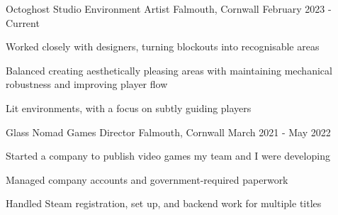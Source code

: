 

\begin{cventries}
    \cventry
        {Octoghost Studio}
        {Environment Artist}
        {Falmouth, Cornwall}
        {February 2023 - Current}
        {
            \begin{cvitems}
                \item Worked closely with designers, turning blockouts into recognisable areas
                \item Balanced creating aesthetically pleasing areas with maintaining mechanical robustness and improving player flow
                \item Lit environments, with a focus on subtly guiding players
            \end{cvitems}
        }

    \cventry
        {Glass Nomad Games}
        {Director}
        {Falmouth, Cornwall}
        {March 2021 - May 2022}
        {
            \begin{cvitems}
                \item Started a company to publish video games my team and I were developing
                \item Managed company accounts and government-required paperwork
                \item Handled Steam registration, set up, and backend work for multiple titles
            \end{cvitems}
        }



\end{cventries}
